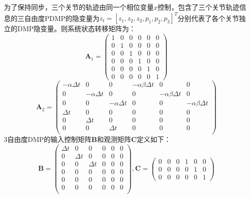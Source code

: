 为了保持同步，三个关节的轨迹由同一个相位变量$x$控制，包含了三个关节轨迹信息的三自由度PDMP的隐变量为$z_t=[z_1,z_2,z_3,p_1,p_2,p_3]^T$分别代表了各个关节独立的DMP隐变量。则系统状态转移矩阵为：
\begin{equation}
    \mathbf{A}_1=\left(\begin{array}{llllll}
    1 & 0 & 0 & 0 & 0 & 0\\
    0 & 1 & 0 & 0 & 0 & 0\\
    0 & 0 & 1 & 0 & 0 & 0\\
    0 & 0 & 0 & 1 & 0 & 0\\
    0 & 0 & 0 & 0 & 1 & 0\\
    0 & 0 & 0 & 0 & 0 & 1
    \end{array}\right)
    \label{eq:4-40}
\end{equation}
\begin{equation}
    \mathbf{A}_2=\left(\begin{array}{cccccc}
    -\alpha \Delta t & 0 & 0 & -\alpha \beta \Delta t & 0 & 0 \\
    0 &-\alpha \Delta t & 0 & 0 &-\alpha \beta \Delta t & 0 \\
    0 & 0 & -\alpha \Delta t & 0 & 0 &  -\alpha \beta \Delta t \\
    \Delta t & 0 & 0 & 0 & 0 & 0 \\
    0 & \Delta t & 0 & 0 & 0 & 0 \\
    0 & 0 & \Delta t &  0 & 0 & 0 \\
    \end{array}\right)
    \label{eq:4-41}
\end{equation}
3自由度DMP的输入控制矩阵$\mathbf{B}$和观测矩阵$\mathbf{C}$定义如下：
\begin{equation}
    \mathbf{B}=\left(\begin{array}{cccccc}
    \Delta t & 0 & 0 & 0& 0& 0\\
    0 & \Delta t & 0 & 0& 0& 0\\
    0 & 0 & \Delta t & 0& 0& 0\\
    0 & 0 & 0 & 0& 0& 0\\
    0 & 0 & 0 & 0& 0& 0\\
    0 & 0 & 0 & 0& 0& 0\\
    \end{array}\right), \mathbf{C}=\left(\begin{array}{llllll}
    0 & 0 & 0 & 1 & 0 &0\\
    0 & 0 & 0 & 0 & 1 &0\\
    0 & 0 & 0 & 0 & 0 &1
    \end{array}\right)
    \label{eq:4-42}
\end{equation}
